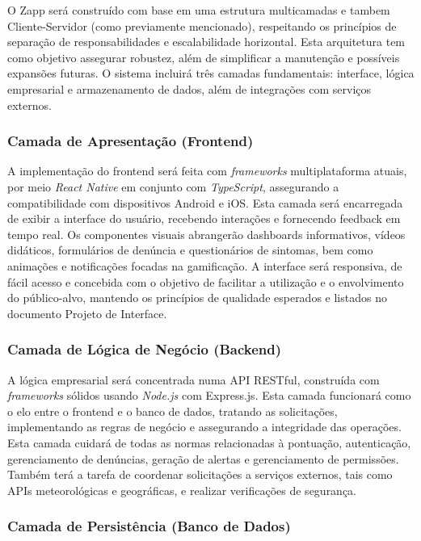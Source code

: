 \documentclass[a4paper, 12pt]{article}
\begin{document}
O Zapp será construído com base em uma estrutura multicamadas e tambem Cliente-Servidor (como previamente mencionado), respeitando os princípios de separação de responsabilidades e escalabilidade horizontal.  Esta arquitetura tem como objetivo assegurar robustez, além de simplificar a manutenção e possíveis expansões futuras.  O sistema incluirá três camadas fundamentais: interface, lógica empresarial e armazenamento de dados, além de integrações com serviços externos.

\subsubsection{Camada de Apresentação (Frontend)}

A implementação do frontend será feita com \textit{frameworks} multiplataforma atuais, por meio \textit{React Native} em conjunto com \textit{TypeScript}, assegurando a compatibilidade com dispositivos Android e iOS.  Esta camada será encarregada de exibir a interface do usuário, recebendo interações e fornecendo feedback em tempo real.
Os componentes visuais abrangerão dashboards informativos, vídeos didáticos, formulários de denúncia e questionários de sintomas, bem como animações e notificações focadas na gamificação.  A interface será responsiva, de fácil acesso e concebida com o objetivo de facilitar a utilização e o envolvimento do público-alvo, mantendo os princípios de qualidade esperados e listados no documento Projeto de Interface.


\subsubsection{Camada de Lógica de Negócio (Backend)}

A lógica empresarial será concentrada numa API RESTful, construída com \textit{frameworks} sólidos usando \textit{Node.js} com Express.js. Esta camada funcionará como o elo entre o frontend e o banco de dados, tratando as solicitações, implementando as regras de negócio e assegurando a integridade das operações.
Esta camada cuidará de todas as normas relacionadas à pontuação, autenticação, gerenciamento de denúncias, geração de alertas e gerenciamento de permissões.  Também terá a tarefa de coordenar solicitações a serviços externos, tais como APIs meteorológicas e geográficas, e realizar verificações de segurança.

\subsubsection{Camada de Persistência (Banco de Dados)}
\end{document}
